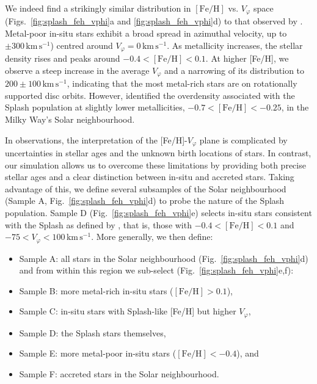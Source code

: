 \documentclass[fleqn,usenatbib]{mnras}
\begin{document}
We indeed find a strikingly similar distribution in $\mathrm{[Fe/H]}$ vs. $V_\varphi$ space (Figs.~\ref{fig:splash_feh_vphi}a and \ref{fig:splash_feh_vphi}d) to that observed by \citet{Belokurov2020}. Metal-poor in-situ stars exhibit a broad spread in azimuthal velocity, up to $\pm 300\,\mathrm{km\,s^{-1}}$) centred around $V_\varphi = 0\,\mathrm{km\,s^{-1}}$. As metallicity increases, the stellar density rises and peaks around $-0.4 < \mathrm{[Fe/H]} < 0.1$. At higher [Fe/H], we observe a steep increase in the average $V_\varphi$ and a narrowing of its distribution to $200 \pm 100\,\mathrm{km\,s^{-1}}$, indicating that the most metal-rich stars are on rotationally supported disc orbits. However, \citet{Belokurov2020} identified the overdensity associated with the Splash population at slightly lower metallicities, $-0.7 < \mathrm{[Fe/H]} < -0.25$, in the Milky Way's Solar neighbourhood.

In observations, the interpretation of the [Fe/H]-$V_\varphi$ plane is complicated by uncertainties in stellar ages and the unknown birth locations of stars. In contrast, our simulation allows us to overcome these limitations by providing both precise stellar ages and a clear distinction between in-situ and accreted stars. Taking advantage of this, we define several subsamples of the Solar neighbourhood (Sample A, Fig.~\ref{fig:splash_feh_vphi}d) to probe the nature of the Splash population. Sample D (Fig.~\ref{fig:splash_feh_vphi}e) selects in-situ stars consistent with the Splash as defined by \citet{Belokurov2020}, that is, those with $-0.4 < \mathrm{[Fe/H]} < 0.1$ and $-75 < V_\varphi < 100\,\mathrm{km\,s^{-1}}$. More generally, we then define:
\begin{itemize}[leftmargin=2em,labelwidth=2em]
    \item Sample A: all stars in the Solar neighbourhood (Fig.~\ref{fig:splash_feh_vphi}d) \\
    and from within this region we sub-select (Fig.~\ref{fig:splash_feh_vphi}e,f):
    \item Sample B: more metal-rich in-situ stars ($\mathrm{[Fe/H]} > 0.1$),
    \item Sample C: in-situ stars with Splash-like [Fe/H] but higher $V_\varphi$,
    \item Sample D: the Splash stars themselves,
    \item Sample E: more metal-poor in-situ stars ($\mathrm{[Fe/H]} < -0.4$), and
    \item Sample F: accreted stars in the Solar neighbourhood.
\end{itemize}
\end{document}
